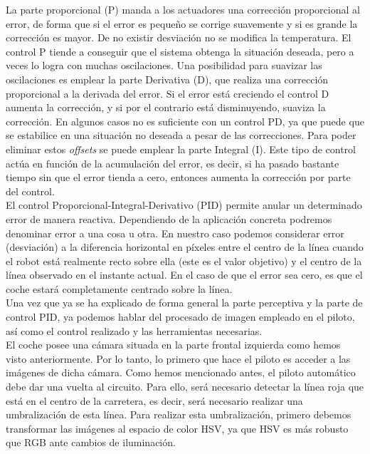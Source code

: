 La parte proporcional (P) manda a los actuadores una corrección proporcional al error, de forma que si el error es pequeño se corrige suavemente y si es grande la corrección es mayor. De no existir desviación no se modifica la temperatura. El control P tiende a conseguir que el sistema obtenga la situación deseada, pero a veces lo logra con muchas oscilaciones. Una posibilidad para suavizar las oscilaciones es emplear la parte Derivativa (D), que realiza una corrección proporcional a la derivada del error. Si el error está creciendo el control D aumenta la corrección, y si por el contrario está disminuyendo, suaviza la corrección. En algunos casos no es suficiente con un control PD, ya que puede que se estabilice en una situación no deseada a pesar de las correcciones. Para poder eliminar estos \textit{offsets} se puede emplear la parte Integral (I). Este tipo de control actúa en función de la acumulación del error, es decir, si ha pasado bastante tiempo sin que el error tienda a cero, entonces aumenta la corrección por parte del control.\\

El control Proporcional-Integral-Derivativo (PID) permite anular un determinado error de manera reactiva. Dependiendo de la aplicación concreta podremos denominar error a una cosa u otra. En nuestro caso podemos considerar error (desviación) a la diferencia horizontal en píxeles entre el centro de la línea cuando el robot está realmente recto sobre ella (este es el valor objetivo) y el centro de la línea observado en el instante actual. En el caso de que el error sea cero, es que el coche estará completamente centrado sobre la línea.\\


Una vez que ya se ha explicado de forma general la parte perceptiva y la parte de control PID, ya podemos hablar del procesado de imagen empleado en el piloto, así como el control realizado y las herramientas necesarias.\\

El coche posee una cámara situada en la parte frontal izquierda como hemos visto anteriormente. Por lo tanto, lo primero que hace el piloto es acceder a las imágenes de dicha cámara. Como hemos mencionado antes, el piloto automático debe dar una vuelta al circuito. Para ello, será necesario detectar la línea roja que está en el centro de la carretera, es decir, será necesario realizar una umbralización de esta línea. Para realizar esta umbralización, primero debemos transformar las imágenes al espacio de color HSV, ya que HSV es más robusto que RGB ante cambios de iluminación. \\

